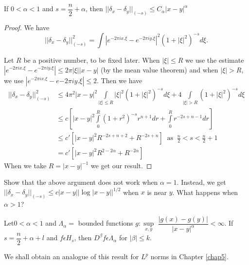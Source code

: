 \setcounter{prop}{8}
\begin{prop} \label{chap3:sec1:prop3.9}%
If $0 < \alpha < 1$ and $s = \dfrac{n}{2} + \alpha$, then $||
  \delta_x - \delta_y ||_{(-s)} \leq C_\alpha | x - y |^\alpha$ 
\end{prop}

\begin{proof}
We have 
$$
|| \delta_x - \delta_y ||_{(-s)}^2  = \int | e^{-2 \pi i x. \xi }-
e^{-2 \pi i y. \xi}|^2 (1 + | \xi |^2)^{-s} d \xi. 
$$

Let $R$ be a positive number, to be fixed later. When $| \xi | \leq R$
we use the estimate $| e^{-2 \pi ix. \xi}-e^{-2\pi iy. \xi} | \leq 2
\pi | \xi | | x-y |$ (by the mean value theorem) and when $| \xi | >
R$, we use $ | e^{-2 \pi ix. \xi}-e{-2 \pi iy. \xi} | \leq 2$. Then we
have 
\begin{align*}
  || \delta_x - \delta_y ||^2_{(-s)} &\leq 4 \pi^2 | x- y |^2
  \int\limits_{| \xi | \leq R} | \xi |^2 (1 + | \xi |^2)^{-s}  d\xi + 4
  \int\limits_{| \xi | > R} (1 + | \xi |^2)^{-s}  d\xi \\ 
  &\leq c \left[ | x-y |^2  \int\limits_0^R (1 + r^2)^{-s} r^{n+1} dr +
    \int\limits_0^R r^{-2 s+n-1} dr \right]\\ 
  &\leq c' \left[ | x-y |^2 R^{-2 s+n+2} + R^{-2 s+n}\right] ~\text{ as
  }~\frac{n}{2} <   s < \frac{n}{2} + 1 \\ 
  &= c' \left[ | x-y |^2 R^{2 - 2 \alpha} + R^{-2 \alpha}\right]
\end{align*}
When we take $R = | x-y |^{-1}$ we get our result.
\end{proof}

\begin{exercise}
  Show that the above argument does not work when
  $\alpha = 1$. Instead, we get $|| \delta_x - \delta_y ||_{(-s)} \leq c
  | x - y | | \log | x- y ||^{1/2}$ when $x$ is near $y$. What happens
  when $\alpha > 1$?
\end{exercise}

\setcounter{coro}{9}
\begin{coro}\label{chap3:sec1:coro3.10}%
  Let\pageoriginale $0 < \alpha < 1$ and $\Lambda_\alpha = $ bounded functions
  $g : \sup\limits_{x, y}$ $\dfrac{| g(x) - g(y) |}{| x - y |^\alpha} <
  \infty$. If $s = \dfrac{n}{2} + \alpha + l$ and $f \epsilon H_s$,
  then $ D^{\beta} f \epsilon \Lambda_\alpha$ for $| \beta | \leq
  k$.  
\end{coro}

\setcounter{rem}{10}
\begin{rem}\label{chap3:sec1:rem3.11}%
  We shall obtain an analogue of this result for $L^p$ norms in
  Chapter \ref{chap5}. 
\end{rem}

